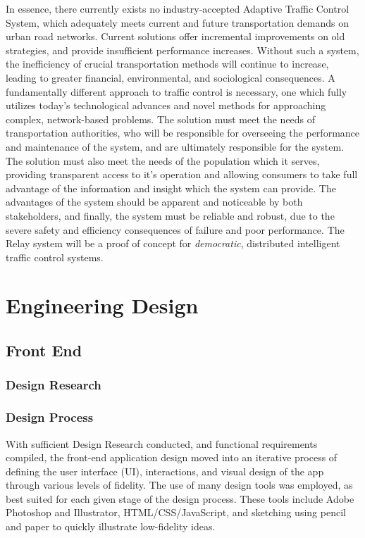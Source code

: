 \documentclass{report}
\begin{document}
In essence, there currently exists no industry-accepted Adaptive Traffic Control System, which adequately meets current and future transportation demands on urban road networks.
Current solutions offer incremental improvements on old strategies, and provide insufficient performance increases.
Without such a system, the inefficiency of crucial transportation methods will continue to increase, leading to greater financial, environmental, and sociological consequences.
A fundamentally different approach to traffic control is necessary, one which fully utilizes today's technological advances and novel methods for approaching complex, network-based problems.
The solution must meet the needs of transportation authorities, who will be responsible for overseeing the performance and maintenance of the system, and are ultimately responsible for the system.
The solution must also meet the needs of the population which it serves, providing transparent access to it's operation and allowing consumers to take full advantage of the information and insight which the system can provide.
The advantages of the system should be apparent and noticeable by both stakeholders, and finally, the system must be reliable and robust, due to the severe safety and efficiency consequences of failure and poor performance. The Relay system will be a proof of concept for \emph{democratic}, distributed intelligent traffic control systems.\\

\newpage

\chapter{Engineering Design}

\section{Front End}

\subsection{Design Research}

\subsection{Design Process}
With sufficient Design Research conducted, and functional requirements compiled, the front-end application design moved into an iterative process of defining the user interface (UI), interactions, and visual design of the app through various levels of fidelity.
The use of many design tools was employed, as best suited for each given stage of the design process. 
These tools include Adobe Photoshop and Illustrator, HTML/CSS/JavaScript, and sketching using pencil and paper to quickly illustrate low-fidelity ideas.
\end{document}
